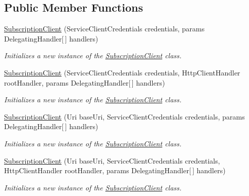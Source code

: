 \subsection*{Public Member Functions}
\begin{DoxyCompactItemize}
\item 
\hyperlink{class_microsoft_1_1_azure_1_1_management_1_1_resources_1_1_subscription_client_a931c719e39cbf61ecc8f9fe0a286befb}{Subscription\+Client} (Service\+Client\+Credentials credentials, params Delegating\+Handler\mbox{[}$\,$\mbox{]} handlers)
\begin{DoxyCompactList}\small\item\em Initializes a new instance of the \hyperlink{class_microsoft_1_1_azure_1_1_management_1_1_resources_1_1_subscription_client}{Subscription\+Client} class. \end{DoxyCompactList}\item 
\hyperlink{class_microsoft_1_1_azure_1_1_management_1_1_resources_1_1_subscription_client_a45216f481936fc3f4a3929d627d31fef}{Subscription\+Client} (Service\+Client\+Credentials credentials, Http\+Client\+Handler root\+Handler, params Delegating\+Handler\mbox{[}$\,$\mbox{]} handlers)
\begin{DoxyCompactList}\small\item\em Initializes a new instance of the \hyperlink{class_microsoft_1_1_azure_1_1_management_1_1_resources_1_1_subscription_client}{Subscription\+Client} class. \end{DoxyCompactList}\item 
\hyperlink{class_microsoft_1_1_azure_1_1_management_1_1_resources_1_1_subscription_client_a1013e624adeaeb71c7b1736405192bc8}{Subscription\+Client} (Uri base\+Uri, Service\+Client\+Credentials credentials, params Delegating\+Handler\mbox{[}$\,$\mbox{]} handlers)
\begin{DoxyCompactList}\small\item\em Initializes a new instance of the \hyperlink{class_microsoft_1_1_azure_1_1_management_1_1_resources_1_1_subscription_client}{Subscription\+Client} class. \end{DoxyCompactList}\item 
\hyperlink{class_microsoft_1_1_azure_1_1_management_1_1_resources_1_1_subscription_client_afc24eb3b8408d05667b9d5e77f649d04}{Subscription\+Client} (Uri base\+Uri, Service\+Client\+Credentials credentials, Http\+Client\+Handler root\+Handler, params Delegating\+Handler\mbox{[}$\,$\mbox{]} handlers)
\begin{DoxyCompactList}\small\item\em Initializes a new instance of the \hyperlink{class_microsoft_1_1_azure_1_1_management_1_1_resources_1_1_subscription_client}{Subscription\+Client} class. \end{DoxyCompactList}\end{DoxyCompactItemize}
